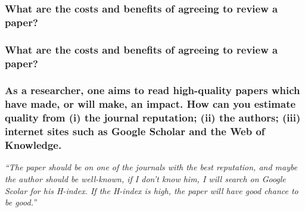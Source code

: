 \documentclass[12pt]{beamer}
\newcommand\ans[1]{{\it ``#1''}}
\begin{document}
\begin{frame}
\frametitle{ What are the costs and benefits of agreeing to review a paper?}







\end{frame} \begin{frame} \frametitle{ What are the costs and benefits of agreeing to review a paper?}



\end{frame} \begin{frame}
  \frametitle{As a researcher, one aims to read high-quality papers which have made, or will make, an impact. How can you estimate quality from (i) the journal reputation; (ii) the authors; (iii) internet sites such as Google Scholar and the Web of Knowledge.}


 \ans{The paper should be on one of the journals with the best reputation, and maybe the author should be well-known, if I don’t know him, I will search on Google Scolar for his H-index.  If the H-index is high, the paper will have good chance to be good.}
  

\end{frame}
\end{document}
